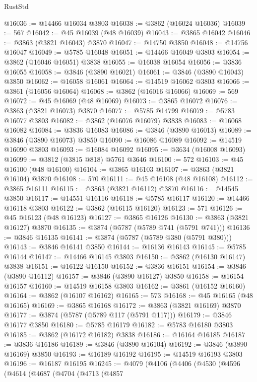 \begin{lexlean}{RustStd}
\begin{coremodule}
@16036 := @14466 @16034 @3803
@16038 := @3862 (@16024 @16036)
@16039 := 567
@16042 := @45 @16039 (@48 @16039)
@16043 := @3865 @16042
@16046 := @3863 (@3821 @16043) @3870
@16047 := @14750 @3850
@16048 := @14756 @16047
@16049 := @5785 @16048
@16051 := @14466 @16049 @3803
@16054 := @3862 (@16046 @16051) @3838
@16055 := @16038 @16054
@16056 := @3836 @16055
@16058 := @3846 (@3890 @16021)
@16061 := @3846 (@3890 @16043) @3850
@16062 := @16058 @16061
@16064 := @14519 @16062 @3803
@16066 := @3861 (@16056 @16064)
@16068 := @3862 (@16016 @16066)
@16069 := 569
@16072 := @45 @16069 (@48 @16069)
@16073 := @3865 @16072
@16076 := @3863 (@3821 @16073) @3870
@16077 := @5785 @14799
@16079 := @5783 @16077 @3803
@16082 := @3862 (@16076 @16079) @3838
@16083 := @16068 @16082
@16084 := @3836 @16083
@16086 := @3846 (@3890 @16013)
@16089 := @3846 (@3890 @16073) @3850
@16090 := @16086 @16089
@16092 := @14519 @16090 @3803
@16093 := @16084 @16092
@16095 := @3634 (@16008 @16093)
@16099 := @3812 (@3815 @818) @5761 @3646
@16100 := 572
@16103 := @45 @16100 (@48 @16100)
@16104 := @3865 @16103
@16107 := @3863 (@3821 @16104) @3870
@16108 := 570
@16111 := @45 @16108 (@48 @16108)
@16112 := @3865 @16111
@16115 := @3863 (@3821 @16112) @3870
@16116 := @14545 @3850
@16117 := @14551 @16116
@16118 := @5785 @16117
@16120 := @14466 @16118 @3803
@16122 := @3862 (@16115 @16120)
@16123 := 571
@16126 := @45 @16123 (@48 @16123)
@16127 := @3865 @16126
@16130 := @3863 (@3821 @16127) @3870
@16135 := @3874 (@5787 (@5789 @741 (@5791 @741)))
@16136 := @3846 @16135
@16141 := @3874 (@5787 (@5789 @380 (@5791 @380)))
@16143 := @3846 @16141 @3850
@16144 := @16136 @16143
@16145 := @5785 @16144
@16147 := @14466 @16145 @3803
@16150 := @3862 (@16130 @16147) @3838
@16151 := @16122 @16150
@16152 := @3836 @16151
@16154 := @3846 (@3890 @16112)
@16157 := @3846 (@3890 @16127) @3850
@16158 := @16154 @16157
@16160 := @14519 @16158 @3803
@16162 := @3861 (@16152 @16160)
@16164 := @3862 (@16107 @16162)
@16165 := 573
@16168 := @45 @16165 (@48 @16165)
@16169 := @3865 @16168
@16172 := @3863 (@3821 @16169) @3870
@16177 := @3874 (@5787 (@5789 @117 (@5791 @117)))
@16179 := @3846 @16177 @3850
@16180 := @5785 @16179
@16182 := @5783 @16180 @3803
@16185 := @3862 (@16172 @16182) @3838
@16186 := @16164 @16185
@16187 := @3836 @16186
@16189 := @3846 (@3890 @16104)
@16192 := @3846 (@3890 @16169) @3850
@16193 := @16189 @16192
@16195 := @14519 @16193 @3803
@16196 := @16187 @16195
@16245 := @4079
    (@4106
      (@4406
        (@4530
          (@4596
            (@4614
              (@4687
                (@4704
                  (@4713
                    (@4857

\end{coremodule}
\end{lexlean}
